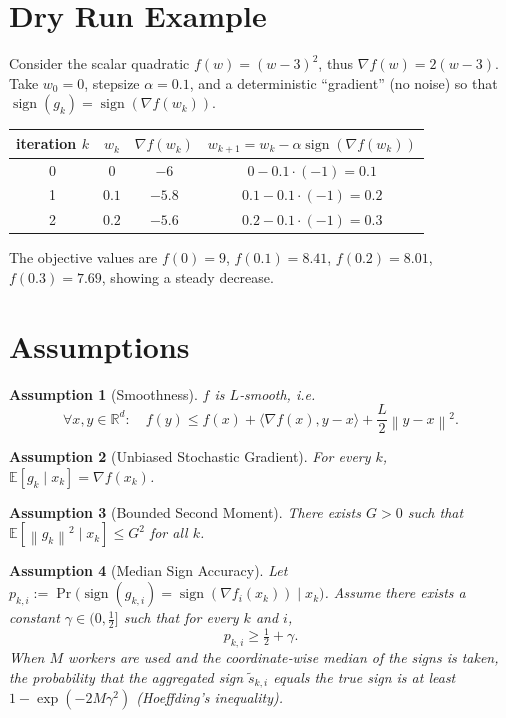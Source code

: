 \documentclass{article}
\newtheorem{assumption}{Assumption}
\newcommand{\sign}{\operatorname{sign}}
\newcommand{\E}{\mathbb{E}}
\newcommand{\R}{\mathbb{R}}
\newcommand{\norm}[1]{\left\lVert#1\right\rVert}
\begin{document}
\section*{Dry Run Example}
Consider the scalar quadratic $f(w)=(w-3)^{2}$, thus $\nabla f(w)=2(w-3)$.  
Take $w_{0}=0$, stepsize $\alpha=0.1$, and a deterministic ``gradient'' (no noise) so that $\sign(g_{k})=\sign(\nabla f(w_{k}))$.

\begin{center}
\begin{tabular}{c|c|c|c}
iteration $k$ & $w_{k}$ & $\nabla f(w_{k})$ & $w_{k+1}=w_{k}-\alpha\sign(\nabla f(w_{k}))$\\\hline
0 & $0$ & $-6$ & $0-0.1\cdot(-1)=0.1$\\
1 & $0.1$ & $-5.8$ & $0.1-0.1\cdot(-1)=0.2$\\
2 & $0.2$ & $-5.6$ & $0.2-0.1\cdot(-1)=0.3$\\
\end{tabular}
\end{center}
The objective values are $f(0)=9$, $f(0.1)=8.41$, $f(0.2)=8.01$, $f(0.3)=7.69$,
showing a steady decrease.

\newpage
\section*{Assumptions}
\begin{assumption}[Smoothness]\label{as:smooth}
$f$ is $L$‑smooth, i.e.
\[
\forall x,y\in\R^{d}:\quad 
f(y)\le f(x)+\langle\nabla f(x),y-x\rangle+\frac{L}{2}\norm{y-x}^{2}.
\]
\end{assumption}
\begin{assumption}[Unbiased Stochastic Gradient]\label{as:unbiased}
For every $k$, $\E[g_{k}\mid x_{k}]=\nabla f(x_{k})$.
\end{assumption}
\begin{assumption}[Bounded Second Moment]\label{as:bounded}
There exists $G>0$ such that $\E[\norm{g_{k}}^{2}\mid x_{k}]\le G^{2}$ for all $k$.
\end{assumption}
\begin{assumption}[Median Sign Accuracy]\label{as:median}
Let $p_{k,i}:=\Pr\bigl(\sign(g_{k,i})=\sign(\nabla f_{i}(x_{k}))\mid x_{k}\bigr)$.
Assume there exists a constant $\gamma\in(0,\tfrac12]$ such that for every $k$ and $i$,
\[
p_{k,i}\ge \tfrac12+\gamma .
\tag{2}
\]
When $M$ workers are used and the coordinate‑wise median of the signs is taken,
the probability that the aggregated sign $\tilde{s}_{k,i}$ equals the true sign
is at least $1-\exp(-2M\gamma^{2})$ (Hoeffding’s inequality).
\end{assumption}
\end{document}
